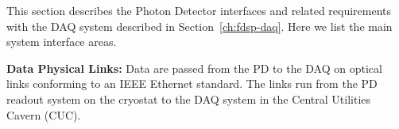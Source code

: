 





This section describes the Photon Detector interfaces and related requirements with the DAQ system described in Section~\ref{ch:fdsp-daq}. Here we list the main system interface areas.


\textbf{Data Physical Links: }Data are passed from the PD to the DAQ on optical links conforming to an IEEE Ethernet standard. The links run from the PD readout system on the cryostat to the DAQ system in the Central Utilities Cavern (CUC).

